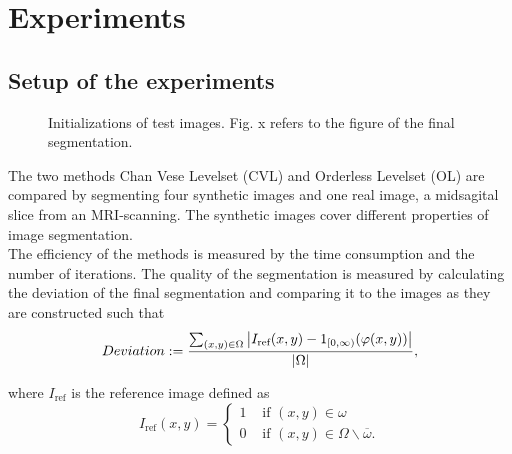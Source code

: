 
\chapter{Experiments}\label{chapter:experiments}
\section{Setup of the experiments}\label{section:setupex}
\begin{figure}[h]
  \centering
  \caption{Initializations of test images. Fig. x refers to the figure of the final segmentation.}
\end{figure}

The two methods Chan Vese Levelset (CVL) and Orderless Levelset (OL) are compared by segmenting four synthetic images and one real image, a midsagital slice from an MRI-scanning. The synthetic images cover different properties of image segmentation.\\
The efficiency of the methods is measured by the time consumption and the number of iterations. The quality of the segmentation is measured by calculating the deviation of the final segmentation and comparing it to the images as they are constructed such that 
\begin{equation}
  Deviation := \frac{\sum_{(x,y)\in\Omega}\left| {I_{\text{ref}}(x,y)-1_{[0,\infty)}(\varphi(x,y))} \right|}{\left| {\Omega} \right|},
\end{equation}

where $I_{\text{ref}}$ is the reference image defined as
\begin{equation}
  I_{\text{ref}}(x,y) = \begin{cases}
    1 & \mbox{ if } (x,y)\in \omega\\
    0 & \mbox{ if } (x,y)\in \Omega\backslash\overline{\omega}.
  \end{cases}
\end{equation}

